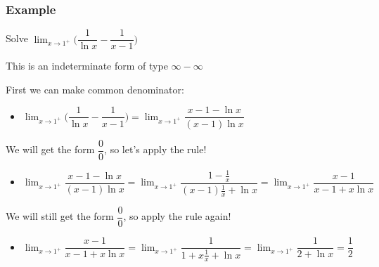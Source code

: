 \documentclass[t]{beamer}
\theoremstyle{plain}
\theoremstyle{definition}
\newcommand{\limm}[1]{\displaystyle \lim_{x\to #1}}
\begin{document}
\begin{frame}

\frametitle{Example}

\footnotesize

Solve $\limm{1^{+}}\big(\dfrac{1}{\ln{x}} - \dfrac{1}{x-1}\big)$

This is an indeterminate form of type $\infty - \infty$  \pause

\medskip

First we can make common denominator:

\begin{itemize}
	\item $\limm{1^{+}}\big(\dfrac{1}{\ln{x}} - \dfrac{1}{x-1}\big) = \limm{1^{+}}\dfrac{x - 1 - \ln{x}}{(x-1)\ln{x}}$
\end{itemize}

We will get the form $\dfrac{0}{0}$, so let's apply the rule!

\begin{itemize}
	\item $\limm{1^{+}}\dfrac{x - 1 - \ln{x}}{(x-1)\ln{x}} = \limm{1^{+}}\dfrac{1-\frac{1}{x}}{(x-1)\frac{1}{x}+\ln{x}} =  \limm{1^{+}}\dfrac{x-1}{x-1 + x\ln{x}}$
\end{itemize}

We will still get the form $\dfrac{0}{0}$, so apply the rule again!

\begin{itemize}
	\item $\limm{1^{+}}\dfrac{x-1}{x-1 + x\ln{x}} = \limm{1^{+}}\dfrac{1}{1 + x\frac{1}{x} + \ln{x}} = \limm{1^{+}}\dfrac{1}{2 + \ln{x}} = \dfrac{1}{2}$ 
\end{itemize}

\end{frame}
\end{document}
